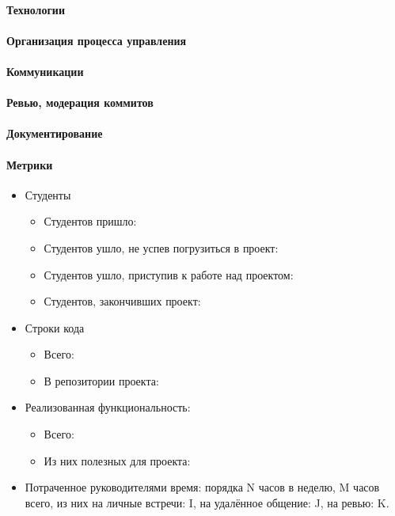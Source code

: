 \documentclass[a5paper]{article}
\begin{document}
\paragraph{Технологии}

\paragraph{Организация процесса управления}

\paragraph{Коммуникации}

\paragraph{Ревью, модерация коммитов}

\paragraph{Документирование}

\paragraph{Метрики}
\begin{itemize}
	\item Студенты
		\begin{itemize}
			\item Студентов пришло: 
			\item Студентов ушло, не успев погрузиться в проект:
			\item Студентов ушло, приступив к работе над проектом:
			\item Студентов, закончивших проект:
		\end{itemize}
	\item Строки кода
		\begin{itemize}
			\item Всего:
			\item В репозитории проекта:
		\end{itemize}
	\item Реализованная функциональность:
		\begin{itemize}
			\item Всего: 
			\item Из них полезных для проекта: 
		\end{itemize}
	\item Потраченное руководителями время: порядка N часов в неделю, M часов всего, из них на личные встречи: I, на удалённое общение: J, на ревью: K.
\end{itemize}
\end{document}
